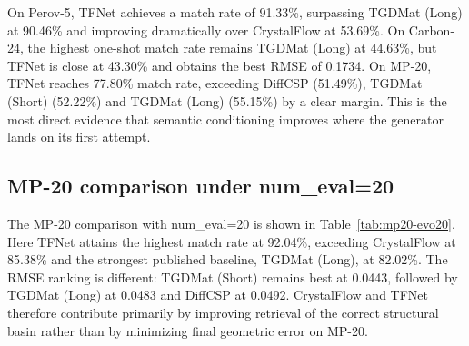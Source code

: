 \documentclass[fleqn,10pt]{wlscirep}
\begin{document}
On Perov-5, TFNet achieves a match rate of 91.33\%, surpassing TGDMat (Long) at 90.46\% and improving dramatically over CrystalFlow at 53.69\%. On Carbon-24, the highest one-shot match rate remains TGDMat (Long) at 44.63\%, but TFNet is close at 43.30\% and obtains the best RMSE of 0.1734. On MP-20, TFNet reaches 77.80\% match rate, exceeding DiffCSP (51.49\%), TGDMat (Short) (52.22\%) and TGDMat (Long) (55.15\%) by a clear margin. This is the most direct evidence that semantic conditioning improves where the generator lands on its first attempt.

\begin{table}[ht]
\centering
\small
\setlength{\tabcolsep}{4pt}
\caption{\textbf{Single-sample comparison across Perov-5, Carbon-24 and MP-20 (best in bold; second-best underlined).} Values for P-cG-SchNet, CDVAE, DiffCSP and TGDMat are extracted from the supplied benchmark figure. Values for CrystalFlow and TFNet are taken from the provided one-sample evaluation summary. Bold and underlining indicate the best and second-best results in each column, respectively.}
\label{tab:evo1}
\end{table}

\subsection*{MP-20 comparison under num\_eval=20}
The MP-20 comparison with num\_eval=20 is shown in Table~\ref{tab:mp20-evo20}. Here TFNet attains the highest match rate at 92.04\%, exceeding CrystalFlow at 85.38\% and the strongest published baseline, TGDMat (Long), at 82.02\%. The RMSE ranking is different: TGDMat (Short) remains best at 0.0443, followed by TGDMat (Long) at 0.0483 and DiffCSP at 0.0492. CrystalFlow and TFNet therefore contribute primarily by improving retrieval of the correct structural basin rather than by minimizing final geometric error on MP-20.
\end{document}
